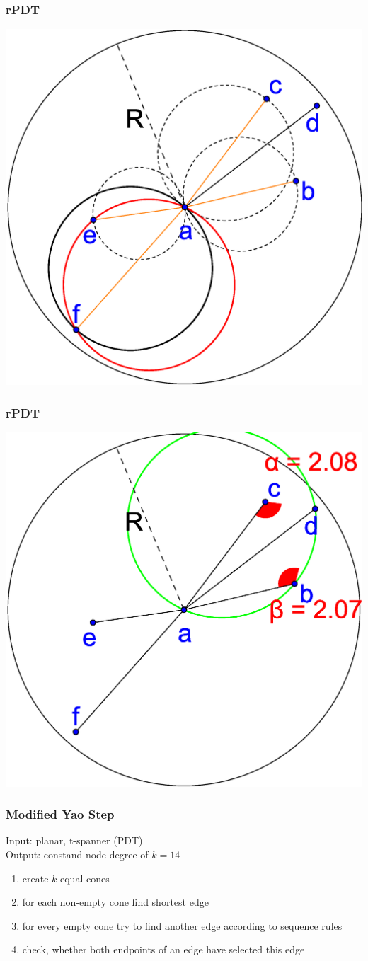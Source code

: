 \documentclass[compress]{beamer}
\begin{document}
\begin{frame} 
\frametitle{rPDT}
\center \includegraphics[width=0.7\linewidth]{PDT_3.eps}
\end{frame}

\begin{frame}
\frametitle{rPDT}
\center \includegraphics[width=0.7\linewidth]{PDT_angle.eps}
\end{frame}

\begin{frame}
\frametitle{Modified Yao Step \cite{kanj}}
Input: planar, t-spanner (PDT)\\
Output: constand node degree of $k = 14 $
	\begin{enumerate}
		\item create $k $ equal cones
		\item for each non-empty cone find shortest edge
		\item for every empty cone try to find another edge according to sequence rules
		\item check, whether both endpoints of an edge have selected this edge
	\end{enumerate}
\end{frame}
\end{document}

